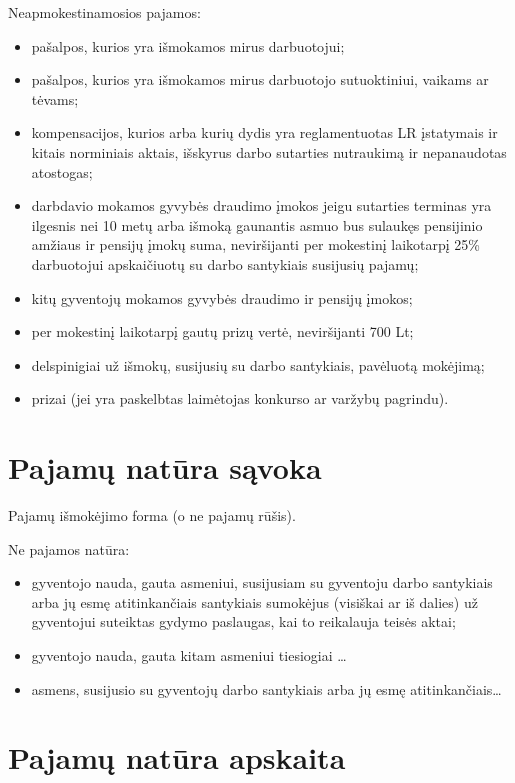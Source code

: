 Neapmokestinamosios pajamos:
\begin{itemize}
  \item pašalpos, kurios yra išmokamos mirus darbuotojui;
  \item pašalpos, kurios yra išmokamos mirus darbuotojo sutuoktiniui, 
    vaikams ar tėvams;
  \item kompensacijos, kurios arba kurių dydis yra reglamentuotas
    LR įstatymais ir kitais norminiais aktais, išskyrus darbo sutarties
    nutraukimą ir nepanaudotas atostogas;
  \item darbdavio mokamos gyvybės draudimo įmokos jeigu sutarties terminas
    yra ilgesnis nei 10 metų arba išmoką gaunantis asmuo bus
    sulaukęs pensijinio amžiaus ir pensijų įmokų suma, neviršijanti
    per mokestinį laikotarpį 25\% darbuotojui apskaičiuotų su
    darbo santykiais susijusių pajamų;
  \item kitų gyventojų mokamos gyvybės draudimo ir pensijų įmokos;
  \item per mokestinį laikotarpį gautų prizų vertė, neviršijanti
    700 Lt;
  \item delspinigiai už išmokų, susijusių su darbo santykiais,
    pavėluotą mokėjimą;
  \item prizai (jei yra paskelbtas laimėtojas konkurso ar varžybų
    pagrindu).
\end{itemize}

\section{Pajamų natūra sąvoka}

\begin{defn}
  Pajamų išmokėjimo forma (o ne pajamų rūšis).
\end{defn}

Ne pajamos natūra:
\begin{itemize}
  \item gyventojo nauda, gauta asmeniui, susijusiam su gyventoju darbo
    santykiais arba jų esmę atitinkančiais santykiais sumokėjus
    (visiškai ar iš dalies) už gyventojui suteiktas gydymo
    paslaugas, kai to reikalauja teisės aktai;
  \item gyventojo nauda, gauta kitam asmeniui tiesiogiai
    …
  \item asmens, susijusio su gyventojų darbo santykiais arba jų esmę
    atitinkančiais…
\end{itemize}

\section{Pajamų natūra apskaita}

